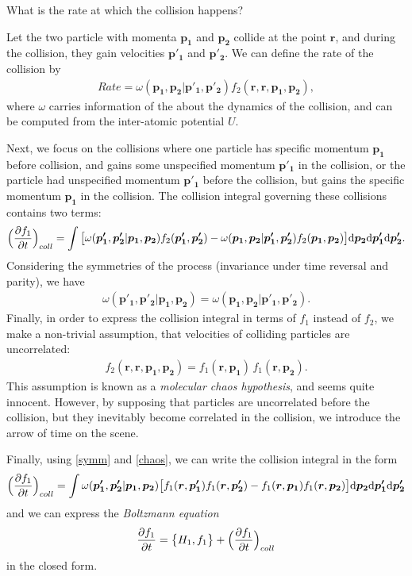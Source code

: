 What is the rate at which the collision happens?

Let the two particle with momenta $\bm{p_1}$ and $\bm{p_2}$ collide at the point $\bm{r}$, and during the collision, they gain velocities $\bm{p'_1}$ and $\bm{p'_2}$.
We can define the rate of the collision by
\begin{align*}
Rate = \omega(\bm{p_1},\bm{p_2} | \bm{p'_1}, \bm{p'_2}) f_2(\bm{r},\bm{r},\bm{p_1},\bm{p_2}),
\end{align*}
where $\omega$ carries information of the about the dynamics of the collision, and can be computed from the inter-atomic potential $U$.

Next, we focus on the collisions where one particle has specific momentum $\bm{p_1}$ before collision, and gains some unspecified momentum $\bm{p'_1}$ in the collision, or the particle had unspecified momentum $\bm{p'_1}$ before the collision, but gains the specific momentum $\bm{p_1}$ in the collision.
The collision integral governing these collisions contains two terms:
\begin{align*}
\Big( \frac{\partial f_1}{\partial t} \Big)_{coll}= \int \big[ \omega(\bm{p'_1},\bm{p'_2} | \bm{p_1}, \bm{p_2}) f_2(\bm{p'_1},\bm{p'_2}) - \omega(\bm{p_1},\bm{p_2} | \bm{p'_1}, \bm{p'_2}) f_2(\bm{p_1}, \bm{p_2}) \big] \mathrm{d} \bm{p_2} \mathrm{d} \bm{p'_1} \mathrm{d} \bm{p'_2}.
\end{align*}
Considering the symmetries of the process (invariance under time reversal and parity), we have
\begin{align} \label{symm} 
\omega(\bm{p'_1},\bm{p'_2} | \bm{p_1}, \bm{p_2}) = \omega(\bm{p_1},\bm{p_2} | \bm{p'_1}, \bm{p'_2}).
\end{align}
Finally, in order to express the collision integral in terms of $f_1$ instead of $f_2$, we make a non-trivial assumption, that velocities of colliding particles are uncorrelated:
\begin{align} \label{chaos}
f_2(\bm{r},\bm{r},\bm{p_1},\bm{p_2}) = f_1(\bm{r},\bm{p_1})\,f_1(\bm{r},\bm{p_2}).
\end{align}
This assumption is known as a \textit{molecular chaos hypothesis}, and seems quite innocent. However, by supposing that particles are uncorrelated before the collision, but they inevitably become correlated in the collision, we introduce the arrow of time on the scene.

Finally, using \ref{symm} and \ref{chaos}, we can write the collision integral in the form
\begin{align} \label{colint}
\Big( \frac{\partial f_1}{\partial t} \Big)_{coll}= \int \omega(\bm{p'_1},\bm{p'_2} | \bm{p_1}, \bm{p_2}) \big[f_1(\bm{r},\bm{p'_1})f_1(\bm{r},\bm{p'_2}) - f_1(\bm{r},\bm{p_1})f_1(\bm{r},\bm{p_2}) \big] \mathrm{d} \bm{p_2} \mathrm{d} \bm{p'_1} \mathrm{d} \bm{p'_2}
\end{align}
and we can express the \textit{Boltzmann equation}
\begin{align} \label{Boltz}
\frac{\partial f_1}{\partial t}  = \big\{ H_1, f_1 \big\} + \Big(\frac{\partial f_1}{\partial t} \Big)_{coll}
\end{align}
in the closed form.

